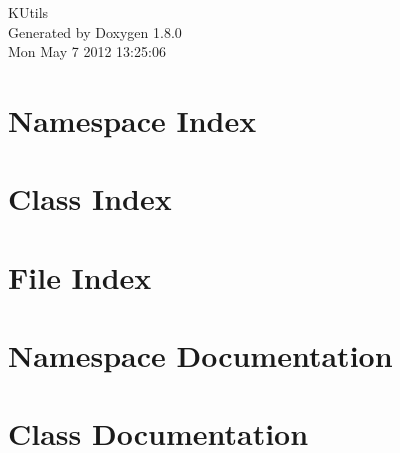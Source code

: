 \documentclass{book}
\begin{document}
\hypersetup{pageanchor=false,citecolor=blue}
\begin{titlepage}
\vspace*{7cm}
\begin{center}
{\Large K\-Utils }\\
\vspace*{1cm}
{\large Generated by Doxygen 1.8.0}\\
\vspace*{0.5cm}
{\small Mon May 7 2012 13:25:06}\\
\end{center}
\end{titlepage}
\clearemptydoublepage
{}
\tableofcontents
\clearemptydoublepage
{}
\hypersetup{pageanchor=true,citecolor=blue}
\chapter{Namespace Index}

\chapter{Class Index}

\chapter{File Index}

\chapter{Namespace Documentation}























\chapter{Class Documentation}

















\end{document}
